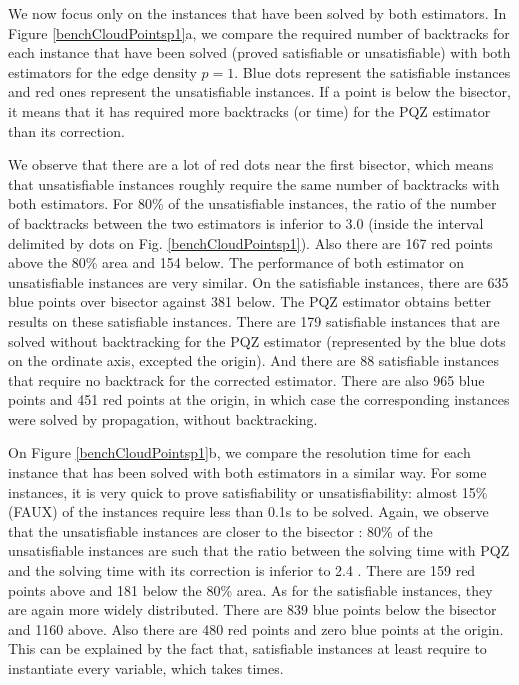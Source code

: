 \documentclass[jair,twoside,11pt,theapa]{article}
\begin{document}
We now focus only on the instances that have been solved by both estimators. In Figure \ref{benchCloudPointsp1}a, we compare the required number of backtracks for each instance that have been solved (proved satisfiable or unsatisfiable) with both estimators for the edge density $p=1$. Blue dots represent the satisfiable instances and red ones represent the unsatisfiable instances. If a point is below the bisector, it means that it has required more backtracks (or time) for the PQZ estimator than its correction. 

We observe that there are a lot of red dots near the first bisector, which means that unsatisfiable instances roughly require the same number of backtracks with both estimators. For 80\% of the unsatisfiable instances, the ratio of the number of backtracks between the two estimators is inferior to 3.0 (inside the interval delimited by dots on Fig. \ref{benchCloudPointsp1}). Also there are 167 red points above the 80\% area and 154 below. The performance of both estimator on unsatisfiable instances are very similar. On the satisfiable instances, there are 635 blue points over bisector against 381 below. The PQZ estimator obtains better results on these satisfiable instances. There are 179 satisfiable instances that are solved without backtracking for the PQZ estimator (represented by the blue dots on the ordinate axis, excepted the origin). And there are 88 satisfiable instances that require no backtrack for the corrected estimator. There are also 965 blue points and 451 red points at the origin, in which case the corresponding instances were solved by propagation, without backtracking.

On Figure \ref{benchCloudPointsp1}b, we compare the resolution time for each instance that has been solved with both estimators in a similar way. For some instances, it is very quick to prove satisfiability or unsatisfiability: almost 15\% (FAUX) of the instances require less than 0.1s to be solved. Again, we  observe that the unsatisfiable instances are closer to the bisector : 80\% of the unsatisfiable instances are such that the ratio between the solving time with PQZ and the solving time with its correction is inferior to 2.4 . There are 159 red points above and 181 below the 80\% area. As for the satisfiable instances, they are again more widely distributed. There are 839 blue points below the bisector and 1160 above. Also there are 480 red points and zero blue points at the origin. This can be explained by the fact that, satisfiable instances at least require to instantiate  every variable, which takes times. 
\end{document}
